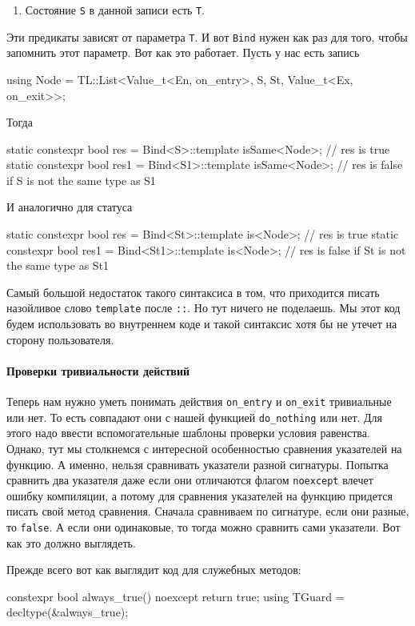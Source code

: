 \documentclass{article}
\begin{document}
{\begin{enumerate}
\item Состояние \verb"S" в данной записи есть \verb"T".
\end{enumerate}
Эти предикаты зависят от параметра \verb"T".
И вот \verb"Bind" нужен как раз для того, чтобы запомнить этот параметр.
Вот как это работает.
Пусть у нас есть запись
\begin{cppcode}[\nonumbers]
using Node = TL::List<Value_t<En, on_entry>, S, St, Value_t<Ex, on_exit>>;
\end{cppcode}
Тогда
\begin{cppcode}[\nonumbers]
static constexpr bool res = Bind<S>::template isSame<Node>;
// res is true
static constexpr bool res1 = Bind<S1>::template isSame<Node>;
// res is false if S is not the same type as S1
\end{cppcode}
И аналогично для статуса
\begin{cppcode}[\nonumbers]
static constexpr bool res = Bind<St>::template is<Node>;
// res is true
static constexpr bool res1 = Bind<St1>::template is<Node>;
// res is false if St is not the same type as St1
\end{cppcode}
Самый большой недостаток такого синтаксиса в том, что приходится писать назойливое слово \verb"template" после \verb"::".
Но тут ничего не поделаешь.
Мы этот код будем использовать во внутреннем коде и такой синтаксис хотя бы не утечет на сторону пользователя.

\paragraph{Проверки тривиальности действий}

Теперь нам нужно уметь понимать действия \verb"on_entry" и \verb"on_exit" тривиальные или нет.
То есть совпадают они с нашей функцией \verb"do_nothing" или нет.
Для этого надо ввести вспомогательные шаблоны проверки условия равенства.
Однако, тут мы столкнемся с интересной особенностью сравнения указателей на функцию.
А именно, нельзя сравнивать указатели разной сигнатуры.
Попытка сравнить два указателя даже если они отличаются флагом \verb"noexcept" влечет ошибку компиляции, а потому для сравнения указателей на функцию придется писать свой метод сравнения.
Сначала сравниваем по сигнатуре, если они разные, то \verb"false".
А если они одинаковые, то тогда можно сравнить сами указатели.
Вот как это должно выглядеть.

Прежде всего вот как выглядит код для служебных методов:
\begin{cppcode}
constexpr bool always_true() noexcept {
  return true;
}
using TGuard = decltype(&always_true);


\end{cppcode}}
\end{document}
